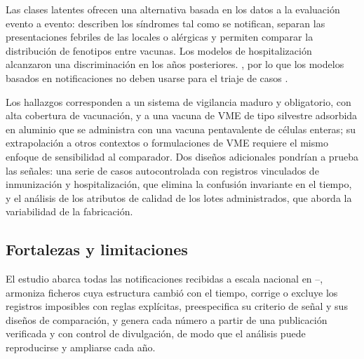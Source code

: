 \documentclass[11pt]{article}
\begin{document}
Las clases latentes ofrecen una alternativa basada en los datos a la evaluación evento a evento:
describen los síndromes tal como se notifican, separan las presentaciones febriles de las locales o
alérgicas y permiten comparar la distribución de fenotipos entre vacunas. Los modelos de
hospitalización alcanzaron una discriminación \PODiscriminationWord{} en los años posteriores.
\POHospInterpretation, por lo que los modelos basados en notificaciones no deben usarse para el
triaje de casos \cite{VanCalster2019,Collins2024}.

Los hallazgos corresponden a un sistema de vigilancia maduro y obligatorio, con alta cobertura de
vacunación, y a una vacuna de VME de tipo silvestre adsorbida en aluminio que se administra con una
vacuna pentavalente de células enteras; su extrapolación a otros contextos o formulaciones de VME
requiere el mismo enfoque de sensibilidad al comparador. Dos diseños adicionales pondrían a prueba
las señales: una serie de casos autocontrolada con registros vinculados de inmunización y
hospitalización, que elimina la confusión invariante en el tiempo, y el análisis de los atributos de
calidad de los lotes administrados, que aborda la variabilidad de la fabricación.

\subsection{Fortalezas y limitaciones}\label{sec:d-limitations}
El estudio abarca todas las notificaciones recibidas a escala nacional en
\VStudyFirstYear--\VStudyLastYear, armoniza ficheros cuya estructura cambió con el tiempo, corrige
o excluye los registros imposibles con reglas explícitas, preespecifica su criterio de señal y sus diseños de comparación, y genera cada número a partir de
una publicación verificada y con control de divulgación, de modo que el análisis puede reproducirse
y ampliarse cada año.
\end{document}
